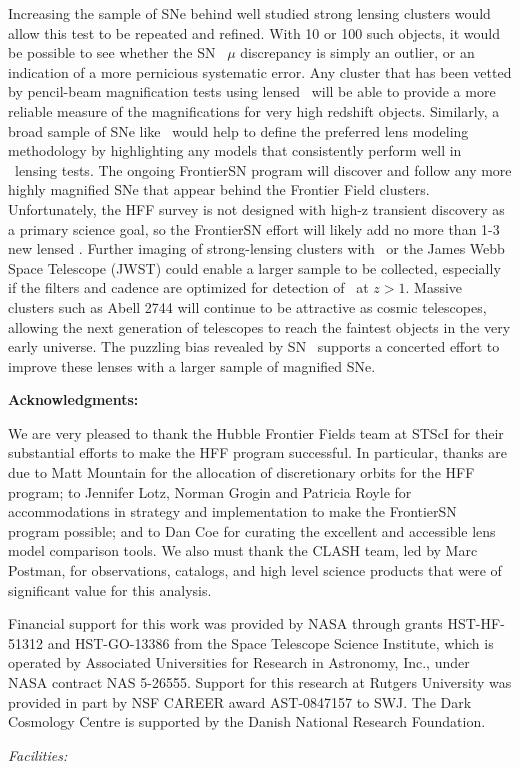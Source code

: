 Increasing the sample of SNe behind well studied strong lensing
clusters would allow this test to be repeated and refined.  With 10 or
100 such objects, it would be possible to see whether the SN \tomas\
$\mu$ discrepancy is simply an outlier, or an indication of a more
pernicious systematic error.  Any cluster that has been vetted by
pencil-beam magnification tests using lensed \SNIa\ will be able to
provide a more reliable measure of the magnifications for very high
redshift objects.  Similarly, a broad sample of SNe like \tomas\ would
help to define the preferred lens modeling methodology by highlighting
any models that consistently perform well in \SNIa\ lensing tests.
The ongoing FrontierSN program will discover and follow any more
highly magnified SNe that appear behind the Frontier Field
clusters. Unfortunately, the HFF survey is not designed with high-z
transient discovery as a primary science goal, so the FrontierSN
effort will likely add no more than 1-3 new lensed \SNIa. Further
imaging of strong-lensing clusters with \HST\ or the James Webb Space
Telescope (JWST) could enable a larger sample to be collected,
especially if the filters and cadence are optimized for detection
of \SNIa\ at $z>1$.  Massive clusters such as Abell 2744 will continue
to be attractive as cosmic telescopes, allowing the next generation of
telescopes to reach the faintest objects in the very early universe.
The puzzling bias revealed by SN \tomas\ supports a concerted effort
to improve these lenses with a larger sample of magnified SNe.


\bigskip


{\bf Acknowledgments:}

We are very pleased to thank the Hubble Frontier Fields team at STScI
for their substantial efforts to make the HFF program successful.  In
particular, thanks are due to Matt Mountain for the allocation of
discretionary orbits for the HFF program; to Jennifer Lotz, Norman
Grogin and Patricia Royle for accommodations in strategy and
implementation to make the FrontierSN program possible; and to Dan Coe
for curating the excellent and accessible lens model comparison tools.
We also must thank the CLASH team, led by Marc Postman, for
observations, catalogs, and high level science products that were of
significant value for this analysis.

Financial support for this work was provided by NASA through grants
HST-HF-51312 and HST-GO-13386 from the Space Telescope
Science Institute, which is operated by Associated Universities for
Research in Astronomy, Inc., under NASA contract NAS 5-26555.  Support
for this research at Rutgers University was provided in part by NSF
CAREER award AST-0847157 to SWJ.  The Dark Cosmology Centre is
supported by the Danish National Research Foundation.


{\it Facilities:} 
\smallskip






